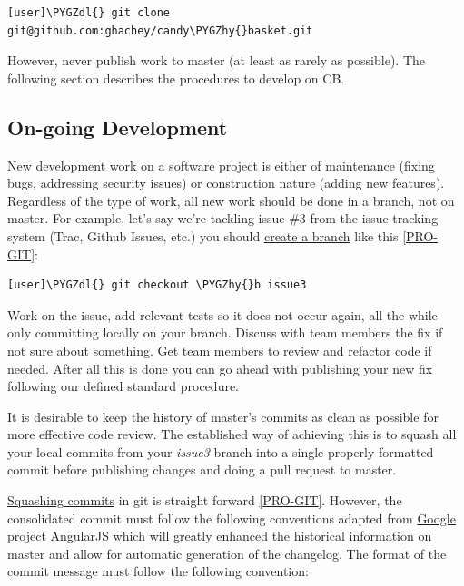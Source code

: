 \documentclass[letterpaper,10pt,english]{sphinxmanual}
\def\PYGZdl{\char`\$}
\def\PYGZhy{\char`\-}
\begin{document}
\begin{Verbatim}[commandchars=\\\{\}]
[user]\PYGZdl{} git clone git@github.com:ghachey/candy\PYGZhy{}basket.git
\end{Verbatim}

However, never publish work to master (at least as rarely as
possible). The following section describes the procedures to develop
on CB.


\subsection{On-going Development}
\label{developer-guide:on-going-development}
New development work on a software project is either of maintenance
(fixing bugs, addressing security issues) or construction nature
(adding new features). Regardless of the type of work, all new work
should be done in a branch, not on master. For example, let's say
we're tackling issue \#3 from the issue tracking system (Trac, Github
Issues, etc.) you should \href{http://www.git-scm.com/book/en/Git-Branching-Basic-Branching-and-Merging}{create a branch}
like this {\hyperref[developer-guide:pro-git]{{[}PRO-GIT{]}}}:

\begin{Verbatim}[commandchars=\\\{\}]
[user]\PYGZdl{} git checkout \PYGZhy{}b issue3
\end{Verbatim}

Work on the issue, add relevant tests so it does not occur again, all
the while only committing locally on your branch. Discuss with team
members the fix if not sure about something. Get team members to
review and refactor code if needed. After all this is done you can go
ahead with publishing your new fix following our defined standard
procedure.

It is desirable to keep the history of master's commits as clean as
possible for more effective code review. The established way of
achieving this is to squash all your local commits from your \emph{issue3}
branch into a single properly formatted commit before publishing
changes and doing a pull request to master.

\href{http://www.git-scm.com/book/en/Git-Tools-Rewriting-History\#Squashing-Commits}{Squashing commits}
in git is straight forward {\hyperref[developer-guide:pro-git]{{[}PRO-GIT{]}}}. However, the consolidated
commit must follow the following conventions adapted from \href{https://docs.google.com/document/d/1QrDFcIiPjSLDn3EL15IJygNPiHORgU1\_OOAqWjiDU5Y/edit\#}{Google
project AngularJS}
which will greatly enhanced the historical information on master and
allow for automatic generation of the changelog. The format of the
commit message must follow the following convention:
\end{document}
